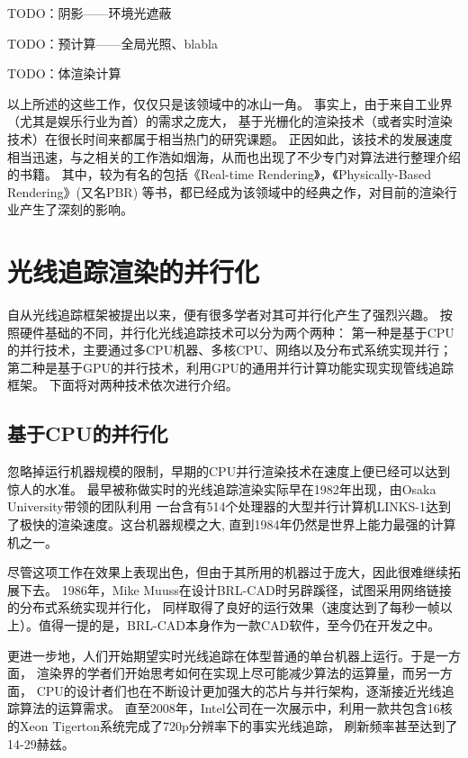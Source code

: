 TODO：阴影——环境光遮蔽

TODO：预计算——全局光照、blabla

TODO：体渲染计算

以上所述的这些工作，仅仅只是该领域中的冰山一角。
事实上，由于来自工业界（尤其是娱乐行业为首）的需求之庞大，
基于光栅化的渲染技术（或者实时渲染技术）在很长时间来都属于相当热门的研究课题。
正因如此，该技术的发展速度相当迅速，与之相关的工作浩如烟海，从而也出现了不少专门对算法进行整理介绍的书籍。
其中，较为有名的包括《Real-time Rendering》\cite{RealTimeRendering}，《Physically-Based Rendering》\cite{PhysicallyBasedRendering}(又名PBR)
等书，都已经成为该领域中的经典之作，对目前的渲染行业产生了深刻的影响。


\section{光线追踪渲染的并行化}

自从光线追踪框架被提出以来，便有很多学者对其可并行化产生了强烈兴趣。
按照硬件基础的不同，并行化光线追踪技术可以分为两个两种：
第一种是基于CPU的并行技术，主要通过多CPU机器、多核CPU、网络以及分布式系统实现并行；
第二种是基于GPU的并行技术，利用GPU的通用并行计算功能实现实现管线追踪框架。
下面将对两种技术依次进行介绍。

\subsection{基于CPU的并行化}

忽略掉运行机器规模的限制，早期的CPU并行渲染技术在速度上便已经可以达到惊人的水准。
最早被称做实时的光线追踪渲染实际早在1982年出现，由Osaka University带领的团队利用
一台含有514个处理器的大型并行计算机LINKS-1达到了极快的渲染速度\cite{LINKS1}。这台机器规模之大,
直到1984年仍然是世界上能力最强的计算机之一。

尽管这项工作在效果上表现出色，但由于其所用的机器过于庞大，因此很难继续拓展下去。
1986年，Mike Muuss在设计BRL-CAD时另辟蹊径，试图采用网络链接的分布式系统实现并行化，
同样取得了良好的运行效果（速度达到了每秒一帧以上）\cite{BRLCAD}。值得一提的是，BRL-CAD本身作为一款CAD软件，至今仍在开发之中。

更进一步地，人们开始期望实时光线追踪在体型普通的单台机器上运行。于是一方面，
渲染界的学者们开始思考如何在实现上尽可能减少算法的运算量，而另一方面，
CPU的设计者们也在不断设计更加强大的芯片与并行架构，逐渐接近光线追踪算法的运算需求。
直至2008年，Intel公司在一次展示中，利用一款共包含16核的Xeon Tigerton系统完成了720p分辨率下的事实光线追踪，
刷新频率甚至达到了14-29赫兹\cite{QuakeWars}。

